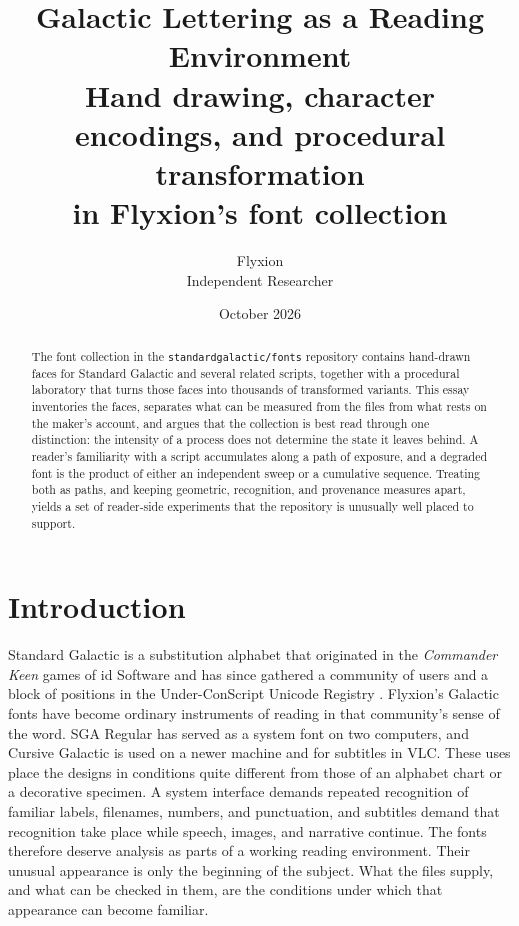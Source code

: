 \documentclass[11pt]{article}
\title{Galactic Lettering as a Reading Environment\\[0.4em]
\large Hand drawing, character encodings, and procedural transformation\\ in Flyxion's font collection}
\author{Flyxion\\ \small Independent Researcher}
\date{October 2026}
\begin{document}
\maketitle

\begin{abstract}
\noindent
The font collection in the \texttt{standardgalactic/fonts} repository contains hand-drawn faces for Standard Galactic and several related scripts, together with a procedural laboratory that turns those faces into thousands of transformed variants. This essay inventories the faces, separates what can be measured from the files from what rests on the maker's account, and argues that the collection is best read through one distinction: the intensity of a process does not determine the state it leaves behind. A reader's familiarity with a script accumulates along a path of exposure, and a degraded font is the product of either an independent sweep or a cumulative sequence. Treating both as paths, and keeping geometric, recognition, and provenance measures apart, yields a set of reader-side experiments that the repository is unusually well placed to support.
\end{abstract}

\section{Introduction}

Standard Galactic is a substitution alphabet that originated in the \emph{Commander Keen} games of id Software and has since gathered a community of users and a block of positions in the Under-ConScript Unicode Registry \cite{ucsur-sga,ucsur}. Flyxion's Galactic fonts have become ordinary instruments of reading in that community's sense of the word. SGA Regular has served as a system font on two computers, and Cursive Galactic is used on a newer machine and for subtitles in VLC. These uses place the designs in conditions quite different from those of an alphabet chart or a decorative specimen. A system interface demands repeated recognition of familiar labels, filenames, numbers, and punctuation, and subtitles demand that recognition take place while speech, images, and narrative continue. The fonts therefore deserve analysis as parts of a working reading environment. Their unusual appearance is only the beginning of the subject. What the files supply, and what can be checked in them, are the conditions under which that appearance can become familiar.
\end{document}
